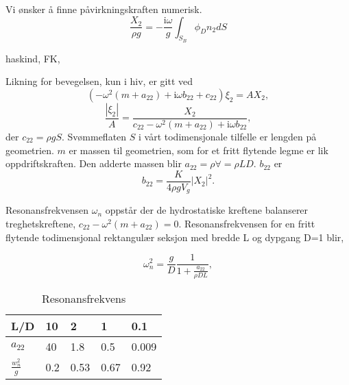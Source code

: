 \documentclass{beamer}
\begin{document}
\begin{frame}
Vi ønsker å finne påvirkningskraften numerisk. 
\begin{equation}
\frac{X_2}{\rho g}  =  -  \frac{\mathrm{i} \omega}{g}\int_{S_B}   \phi_D n_2dS
\end{equation}
\end{frame}

\begin{frame}
haskind, FK, 
\end{frame}

\begin{frame}
Likning for bevegelsen, kun i hiv, er gitt ved
\begin{equation}
( - \omega^2(m+a_{22}) + \mathrm{i}\omega b_{22}+ c_{22})\xi_2 = AX_2, 
\end{equation}
\begin{equation}
\frac{|\xi_2|}{A} = \frac{X_2}{c_{22} - \omega^2(m+a_{22}) + \mathrm{i}\omega b_{22}}, 
\end{equation}
der $c_{22} = \rho g S$. Svømmeflaten $S$ i vårt todimensjonale tilfelle er lengden på geometrien. $m$ er massen til geometrien, som for et fritt flytende legme er lik oppdriftskraften. Den adderte massen blir $a_{22} = \rho \forall = \rho LD$. $b_{22}$ er
\begin{equation}
b_{22} = \frac{K }{4\rho g V_g}|X_2|^2. 
\end{equation}
\end{frame}

\begin{frame}
Resonansfrekvensen $\omega_n$ oppstår der de hydrostatiske kreftene balanserer treghetskreftene, $c_{22}-\omega^2(m+a_{22}) = 0$. Resonansfrekvensen for en fritt flytende todimensjonal rektangulær seksjon med bredde L og dypgang D=1 blir, 

\begin{equation}
\omega^2_n = \frac{g}{D}  \frac{1}{1 + \frac{a_{22}}{\rho DL}}, 
\end{equation}

\begin{table}[htp]
\centering
\renewcommand{\arraystretch}{1.3} %
\caption{Resonansfrekvens}
\label{default}
\begin{tabular}{|p{1cm}|p{1cm}|p{1cm}|p{1cm}|p{1cm}|}
\hline
L/D & 10 & 2 & 1 & 0.1 \\ \hline
$a_{22}$ & 40 & 1.8 & 0.5 & 0.009 \\ \hline
$\frac{w_n^2}{g}$ & 0.2 & 0.53 & 0.67 & 0.92 \\ \hline
\end{tabular}
\end{table}
\end{frame}
\end{document}

